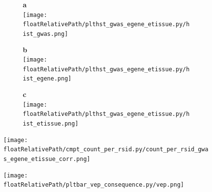 \begin{figure}[h!]
    \centering
    \begin{subfigure}[]{.32\textwidth}
        \textbf{a}
        \\
        \texttt{[image: \\floatRelativePath/plthst\_gwas\_egene\_etissue.py/hist\_gwas.png]}
    \end{subfigure}
    \begin{subfigure}[]{.32\textwidth}
        \textbf{b}
        \\
        \texttt{[image: \\floatRelativePath/plthst\_gwas\_egene\_etissue.py/hist\_egene.png]}
    \end{subfigure}
    \begin{subfigure}[]{.32\textwidth}
        \textbf{c}
        \\
        \texttt{[image: \\floatRelativePath/plthst\_gwas\_egene\_etissue.py/hist\_etissue.png]}
    \end{subfigure}
    \caption{}
\end{figure}

%
%

\begin{figure}[h!]
    \centering
    \texttt{[image: \\floatRelativePath/cmpt\_count\_per\_rsid.py/count\_per\_rsid\_gwas\_egene\_etissue\_corr.png]}
    \caption{}
\end{figure}

%
%

\begin{figure}[h!]
    \centering
    \texttt{[image: \\floatRelativePath/pltbar\_vep\_consequence.py/vep.png]}
    \caption{}
\end{figure}

%
%

